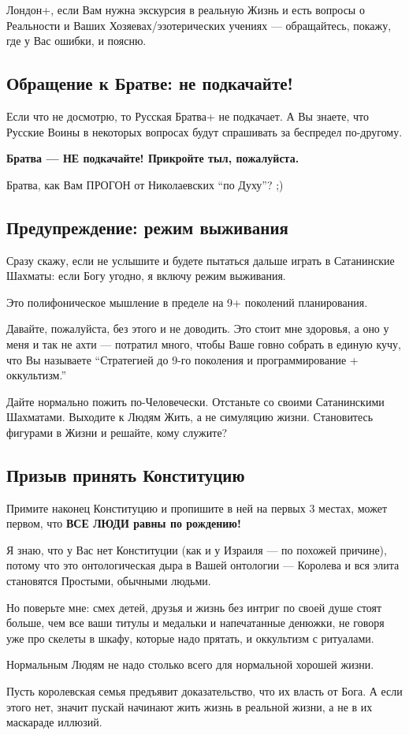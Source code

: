 \documentclass[11pt,a4paper]{article}
\theoremstyle{definition}
\theoremstyle{remark}
\begin{document}
{Лондон+, если Вам нужна экскурсия в реальную Жизнь и есть вопросы о Реальности 
и Ваших Хозяевах/эзотерических учениях — обращайтесь, покажу, где у Вас ошибки, 
и поясню.

\subsection{Обращение к Братве: не подкачайте!}

Если что не досмотрю, то Русская Братва+ не подкачает. А Вы знаете, что Русские 
Воины в некоторых вопросах будут спрашивать за беспредел по-другому.

\textbf{Братва — НЕ подкачайте! Прикройте тыл, пожалуйста.}

Братва, как Вам ПРОГОН от Николаевских ``по Духу''? ;)

\subsection{Предупреждение: режим выживания}

Сразу скажу, если не услышите и будете пытаться дальше играть в Сатанинские Шахматы: 
если Богу угодно, я включу режим выживания.

Это полифоническое мышление в пределе на 9+ поколений планирования.

Давайте, пожалуйста, без этого и не доводить. Это стоит мне здоровья, а оно у меня 
и так не ахти — потратил много, чтобы Ваше говно собрать в единую кучу, что Вы 
называете ``Стратегией до 9-го поколения и программирование + оккультизм.''

Дайте нормально пожить по-Человечески. Отстаньте со своими Сатанинскими Шахматами. 
Выходите к Людям Жить, а не симуляцию жизни. Становитесь фигурами в Жизни и решайте, 
кому служите?

\subsection{Призыв принять Конституцию}

Примите наконец Конституцию и пропишите в ней на первых 3 местах, может первом, 
что \textbf{ВСЕ ЛЮДИ равны по рождению!}

Я знаю, что у Вас нет Конституции (как и у Израиля — по похожей причине), потому 
что это онтологическая дыра в Вашей онтологии — Королева и вся элита становятся 
Простыми, обычными людьми.

Но поверьте мне: смех детей, друзья и жизнь без интриг по своей душе стоят больше, 
чем все ваши титулы и медальки и напечатанные денюжки, не говоря уже про скелеты 
в шкафу, которые надо прятать, и оккультизм с ритуалами.

Нормальным Людям не надо столько всего для нормальной хорошей жизни.

Пусть королевская семья предъявит доказательство, что их власть от Бога. А если 
этого нет, значит пускай начинают жить жизнь в реальной жизни, а не в их маскараде 
иллюзий.

} %
\end{document}
